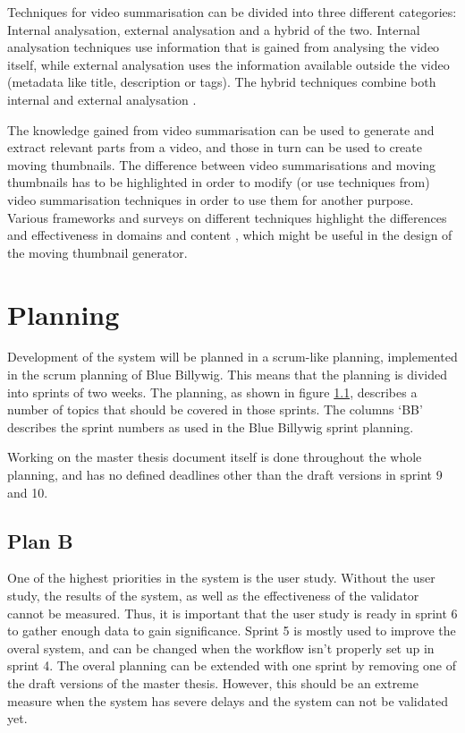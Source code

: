 \documentclass{../resources/acm_proc_article-sp}
\begin{document}
Techniques for video summarisation can be divided into three different categories: Internal analysation, external analysation and a hybrid of the two. Internal analysation techniques use information that is gained from analysing the video itself, while external analysation uses the information available outside the video (metadata like title, description or tags). The hybrid techniques combine both internal and external analysation \cite{Money:2008fn}.

The knowledge gained from video summarisation can be used to generate and extract relevant parts from a video, and those in turn can be used to create moving thumbnails. The difference between video summarisations and moving thumbnails has to be highlighted in order to modify (or use techniques from) video summarisation techniques in order to use them for another purpose. Various frameworks and surveys on different techniques highlight the differences and effectiveness in domains and content \cite{Money:2008fn,Ajmal:2012hi}, which might be useful in the design of the moving thumbnail generator.

\section{Planning}

Development of the system will be planned in a scrum-like planning, implemented in the scrum planning of Blue Billywig. This means that the planning is divided into sprints of two weeks. The planning, as shown in figure \ref{}, describes a number of topics that should be covered in those sprints. The columns `BB' describes the sprint numbers as used in the Blue Billywig sprint planning.

Working on the master thesis document itself is done throughout the whole planning, and has no defined deadlines other than the draft versions in sprint 9 and 10. 

\subsection{Plan B}

One of the highest priorities in the system is the user study. Without the user study, the results of the system, as well as the effectiveness of the validator cannot be measured. Thus, it is important that the user study is ready in sprint 6 to gather enough data to gain significance. Sprint 5 is mostly used to improve the overal system, and can be changed when the workflow isn't properly set up in sprint 4. The overal planning can be extended with one sprint by removing one of the draft versions of the master thesis. However, this should be an extreme measure when the system has severe delays and the system can not be validated yet.

\printbibliography

\balancecolumns
\end{document}
